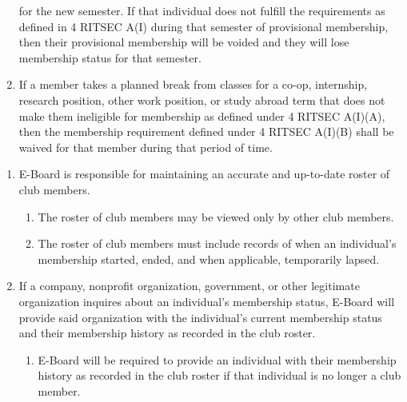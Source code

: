 \begin{enumerate}
    for the new semester. If that individual does not fulfill the requirements
    as defined in 4 RITSEC A(I) during that semester of provisional
    membership, then their provisional membership will be voided and they will
    lose membership status for that semester.
  \item If a member takes a planned break from classes for a co-op, internship,
    research position, other work position, or study abroad term that does not
    make them ineligible for membership as defined under 4 RITSEC A(I)(A),
    then the membership requirement defined under 4 RITSEC A(I)(B) shall be
    waived for that member during that period of time.
\end{enumerate}


\begin{enumerate}
  \item E-Board is responsible for maintaining an accurate and up-to-date
    roster of club members.
  \begin{enumerate}
    \item The roster of club members may be viewed only by other club members.
    \item The roster of club members must include records of when an
      individual's membership started, ended, and when applicable, temporarily
      lapsed.
  \end{enumerate}
  \item If a company, nonprofit organization, government, or other legitimate
    organization inquires about an individual's membership status, E-Board will
    provide said organization with the individual's current membership status
    and their membership history as recorded in the club roster.
  \begin{enumerate}
    \item E-Board will be required to provide an individual with their
      membership history as recorded in the club roster if that individual is
      no longer a club member.
  \end{enumerate}
\end{enumerate}